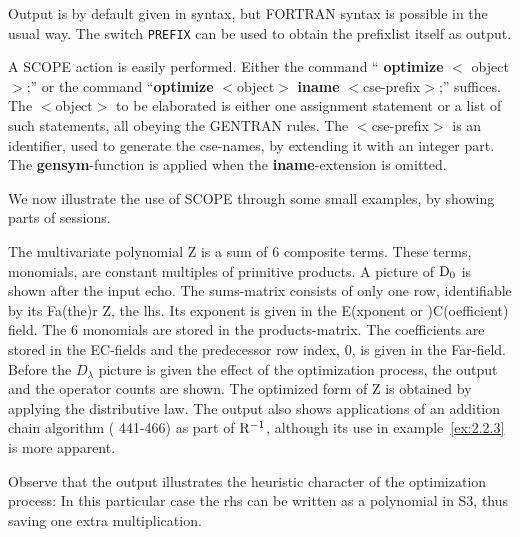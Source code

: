 Output is by default given in {\REDUCE} syntax, but FORTRAN syntax is
possible in the usual way. The switch {\tt PREFIX} can be used to obtain the
prefixlist itself as output.

A SCOPE action is easily performed.  Either the command ``{\bf
optimize} $<$ object$>$;'' or the command ``{\bf optimize}
$<$object$>$ {\bf iname} $<$cse-prefix$>$;'' suffices.  The
$<$object$>$ to be elaborated is either one assignment statement or a
list of such statements, all obeying the GENTRAN rules.  The
$<$cse-prefix$>$ is an identifier, used to generate the cse-names, by
extending it with an integer part. The {\bf gensym}-function is
applied when the {\bf iname}-extension is omitted.

We now illustrate the use of SCOPE through some small examples, by
showing parts of {\REDUCE} sessions.

\example\label{ex:2.2.1}

The multivariate polynomial Z is a sum of 6 composite terms. These
terms, monomials, are constant multiples of primitive products.  A
picture of ${{\rm D}}_{0}$ is shown after the input echo. The
sums-matrix consists of only one row, identifiable by its Fa(the)r Z,
the lhs. Its exponent is given in the E(xponent or )C(oefficient)
field. The 6 monomials are stored in the products-matrix. The
coefficients are stored in the EC-fields and the predecessor row
index, 0, is given in the Far-field. Before the $D_{\lambda}$ picture
is given the effect of the optimization process, the output and the
operator counts are shown. The optimized form of Z is obtained by
applying the distributive law. The output also shows applications of
an addition chain algorithm (\cite{Knuth:80} 441-466) as part of ${{\rm
R}}^{{-1}}$, although its use in example~\ref{ex:2.2.3} is more apparent.

Observe that the output illustrates the heuristic character of the
optimization process: In this particular case the rhs can be written
as a polynomial in S3, thus saving one extra multiplication.

